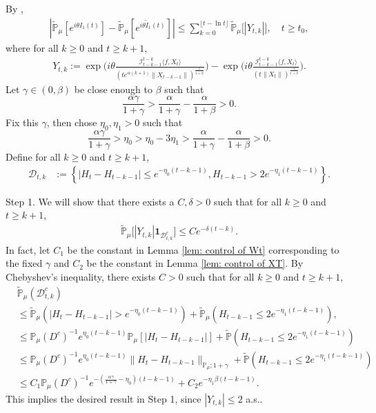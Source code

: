 \documentclass[12pt]{amsart}
\theoremstyle{plain}
\theoremstyle{definition}
\numberwithin{equation}{section}
\begin{document}
By \cite[Lemma 3.4.3.]{Durrett2010Probability},
\begin{align}\label{ineq: control of I1t}
    |\mathbb{\tilde{P}}_{\mu}[e^{i\theta I_1(t)}] - \mathbb{\tilde{P}}_{\mu} [e^{i\theta\tilde{I}_1(t)}]|
    \leq \sum_{k=0}^{\lfloor t-\ln t \rfloor}\mathbb{\tilde{P}}_{\mu}\big[|Y_{t,k}|\big],
    \quad t\geq t_0,
\end{align}
    where for all $k \geq 0$ and $t\geq k+1$,
\begin{align*}
    Y_{t,k}
    :=\exp\Big(i\theta\frac{\mathcal I_{t-k-1}^{t-k}\langle f ,X_t\rangle}{(t e^{\alpha(k+1)}\|X_{t-k-1}\|)^{\frac{1}{1+\beta}}}\Big)-\exp\Big(i\theta\frac{\mathcal I_{t-k-1}^{t-k}\langle f ,X_t\rangle}{(t\|X_t\|)^{\frac{1}{1+\beta}}}\Big).
\end{align*}
    Let $\gamma \in (0,\beta)$ be close enough to $\beta$ such that
\[
    \frac{\alpha \gamma}{1+\gamma} > \frac{\alpha}{1+\gamma} - \frac{\alpha}{1+\beta} > 0.
\]
    Fix this $\gamma$, then chose $\eta_0,\eta_1>0$ such that
\[
    \frac{\alpha \gamma}{1+\gamma} >\eta_0 > \eta_0 - 3\eta_1 > \frac{\alpha}{1+\gamma} - \frac{\alpha}{1+\beta} > 0.
\]
    Define for all $k \geq 0$ and $t\geq k+1$,
\begin{align}
\label{def: Dtk}
    \mathcal{D}_{t,k}&:=\left\{|H_t-H_{t-k-1}|\leq  e^{-\eta_0 (t-k-1)}, H_{t-k-1}> 2e^{-\eta_1(t-k-1)}\right\}.
\end{align}

    Step 1. We will show that there exists a $C,\delta >0$ such that for all $k \geq 0$ and $t\geq k+1$,
\begin{align}
\label{thm121}
    \mathbb{\tilde{P}}_{\mu}\big[|Y_{t,k}|\mathbf{1}_{\mathcal{D}^c_{t,k}}\big]
    \leq C e^{-\delta (t-k)}.
\end{align}
    In fact, let $C_1$ be the constant in  Lemma \ref{lem: control of Wt} corresponding to the fixed $\gamma$ and $C_2$ be the constant in Lemma \ref{lem: control of XT}. 
    By Chebyshev's inequality, there exists $C>0$ such that for all $k \geq 0$ and $t\geq k+1$,
\begin{align}
\label{eq: prob of Dtkc}
    &\mathbb{\tilde{P}}_{\mu}(\mathcal{D}_{t,k}^c)
    \\&\leq \mathbb{\tilde{P}}_{\mu}(|H_t-H_{t-k-1}| > e^{-\eta_0 (t-k-1)})+\mathbb{\tilde{P}}_{\mu}(H_{t-k-1}\leq 2e^{-\eta_1(t-k-1)}),
    \\&\leq \mathbb{P}_{\mu}(D^c)^{-1}e^{\eta_0(t-k-1)}\mathbb{P}_{\mu}[|H_t-H_{t-k-1}|]+\mathbb{\tilde{P}}(H_{t-k-1}\leq 2e^{-\eta_1(t-k-1)})
    \\&\leq \mathbb{P}_{\mu}(D^c)^{-1}  e^{\eta_0(t-k-1)}\|H_t - H_{t-k-1}\|_{\mathbb P_\mu; 1+\gamma}+\mathbb{\tilde{P}}(H_{t-k-1}\leq 2e^{-\eta_1(t-k-1)})
    \\&\leq C_1  \mathbb{P}_{\mu}(D^c)^{-1}  e^{-(\frac{\alpha \gamma}{1+\gamma} - \eta_0)(t-k-1)}+C_2 e^{-\eta_1\beta(t-k-1)}.
\end{align}
    This implies the desired result in Step 1, since $|Y_{t,k}| \leq 2$ a.s..
\end{document}
